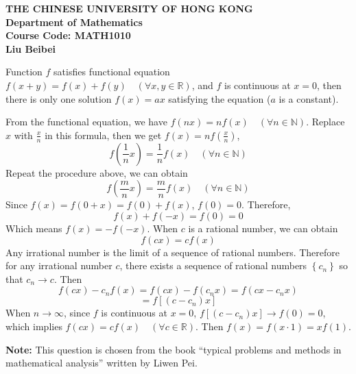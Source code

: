 \documentclass[12pt]{article}
\newenvironment{proof}[1][Proof]{\begin{trivlist}
\item[\hskip \labelsep {\bfseries #1}]}{\end{trivlist}}
\newcommand{\qed}{\nobreak \ifvmode \relax \else
      \ifdim\lastskip<1.5em \hskip-\lastskip
      \hskip1.5em plus0em minus0.5em \fi \nobreak
      \vrule height0.75em width0.5em depth0.25em\fi}
\begin{document}
\pagestyle{myheadings} \thispagestyle{empty} \markright{}

\begin{center}
{\bf THE CHINESE UNIVERSITY OF HONG KONG}\\
{\bf Department of Mathematics}\\
{\bf Course Code: MATH1010} \\
{\bf Liu Beibei} \\
\end{center}

Function $f$ satisfies functional equation $f(x+y)=f(x)+f(y)\quad(\forall x,y\in\mathbb{R})$, and $f$ is continuous at $x=0$, then there is only one
solution $f(x)=ax$ satisfying the equation ($a$ is a constant).
\begin{proof}From the functional equation, we have $f(nx)=nf(x)\quad(\forall n\in\mathbb{N})$. Replace $x$ with $\frac{x}{n}$ in this formula,
	then we get $f(x)=nf\left(\frac{x}{n}\right)$,
	$$f\left(\frac{1}{n}x\right)=\frac{1}{n}f(x)\quad(\forall n\in\mathbb{N})$$
	Repeat the procedure above, we can obtain
	$$f\left(\frac{m}{n}x\right)=\frac{m}{n}f(x)\quad(\forall n\in\mathbb{N})$$
	Since $f(x)=f(0+x)=f(0)+f(x)$, $f(0)=0$. Therefore, $$f(x)+f(-x)=f(0)=0$$
	Which means $f(x)=-f(-x)$. When $c$ is a rational number, we can obtain $$f(cx)=cf(x)$$
	Any irrational number is the limit of a sequence of rational numbers. Therefore for any irrational number $c$, there exists a sequence
	of rational numbers $\left\{c_n\right\}$ so that $c_n\to c$. Then
	$$f(cx)-c_nf(x)=f(cx)-f(c_nx)=f(cx-c_nx)$$\[=f[(c-c_n)x]\]
	When $n\to\infty$, since $f$ is continuous at $x=0$, $f[(c-c_n)x]\to f(0)=0$, which implies $f(cx)=cf(x)\quad(\forall c\in\mathbb{R})$. Then
	$f(x)=f(x\cdot 1)=xf(1)$.
\qed\end{proof}

	{\bf Note:} This question is chosen from the book “typical problems and methods in mathematical
	analysis” written by Liwen Pei.
\end{document}
